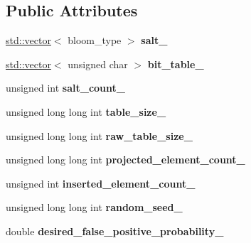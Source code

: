 \subsection*{Public Attributes}
\begin{DoxyCompactItemize}
\item 
\mbox{\label{classfc_1_1bloom__filter_a4aa68713801e124ed96fdeb6acdc91da}} 
\mbox{\hyperlink{classstd_1_1vector}{std\+::vector}}$<$ bloom\+\_\+type $>$ {\bfseries salt\+\_\+}
\item 
\mbox{\label{classfc_1_1bloom__filter_a1456955c8ec72e48d83454a3a82a7a59}} 
\mbox{\hyperlink{classstd_1_1vector}{std\+::vector}}$<$ unsigned char $>$ {\bfseries bit\+\_\+table\+\_\+}
\item 
\mbox{\label{classfc_1_1bloom__filter_a0ce6a19263b4df2b9b8ef1170603507b}} 
unsigned int {\bfseries salt\+\_\+count\+\_\+}
\item 
\mbox{\label{classfc_1_1bloom__filter_a7288d926a8bfe6e783b65641e84b4c64}} 
unsigned long long int {\bfseries table\+\_\+size\+\_\+}
\item 
\mbox{\label{classfc_1_1bloom__filter_abf3a0473b9cf4df2c4f000ca87f6649d}} 
unsigned long long int {\bfseries raw\+\_\+table\+\_\+size\+\_\+}
\item 
\mbox{\label{classfc_1_1bloom__filter_aa60f2c26fc7e77e3757e11649ddb68df}} 
unsigned long long int {\bfseries projected\+\_\+element\+\_\+count\+\_\+}
\item 
\mbox{\label{classfc_1_1bloom__filter_aeb75fe01b8b19f559c8ea27c2e6e54b6}} 
unsigned int {\bfseries inserted\+\_\+element\+\_\+count\+\_\+}
\item 
\mbox{\label{classfc_1_1bloom__filter_afca8eb2c8812ac907106407a5e9324da}} 
unsigned long long int {\bfseries random\+\_\+seed\+\_\+}
\item 
\mbox{\label{classfc_1_1bloom__filter_ae5376d38d0df19b97e30172e9b7f9d64}} 
double {\bfseries desired\+\_\+false\+\_\+positive\+\_\+probability\+\_\+}
\end{DoxyCompactItemize}

